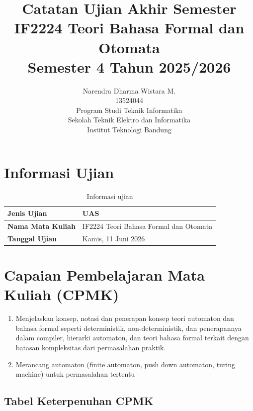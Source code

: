 \documentclass[11pt,a4paper]{article}
\title{%
    \vspace{-2cm}
    \textbf{\LARGE Catatan Ujian Akhir Semester} \\[0.25em]
    \Large IF2224 Teori Bahasa Formal dan Otomata \\[0.25em]
    \normalsize Semester 4 Tahun 2025/2026 \\[2em]
}
\author{%
    Narendra Dharma Wistara M. \\[0.25em]
    13524044 \\[2.5em]
    Program Studi Teknik Informatika \\[0.25em]
    Sekolah Teknik Elektro dan Informatika \\[0.25em]
    Institut Teknologi Bandung \\[0.25em]
}
\begin{document}
\begin{titlepage}
    \maketitle
    \thispagestyle{empty}
\end{titlepage}

\clearpage

\tableofcontents

\clearpage
{}

\section{Informasi Ujian}

\begin{table}[H]
\centering
\begin{tabularx}{\textwidth}{|L{0.30\textwidth}|X|}
\hline
\textbf{Jenis Ujian} & UAS \\
\hline
\textbf{Nama Mata Kuliah} & IF2224 Teori Bahasa Formal dan Otomata \\
\hline
\textbf{Tanggal Ujian} & Kamis, 11 Juni 2026 \\
\hline
\end{tabularx}
\caption{Informasi ujian}
\label{tab:informasi-ujian}
\end{table}

\section{Capaian Pembelajaran Mata Kuliah (CPMK)}

\begin{enumerate}
    \item Menjelaskan konsep, notasi dan penerapan konsep teori automaton dan bahasa formal seperti deterministik, non-deterministik, dan penerapannya dalam compiler, hierarki automaton, dan teori bahasa formal terkait dengan batasan kompleksitas dari permasalahan praktik.
    \item Merancang automaton (finite automaton, push down automaton, turing machine) untuk permasalahan tertentu
\end{enumerate}

\subsection{Tabel Keterpenuhan CPMK}
\end{document}
